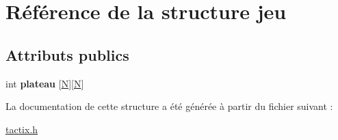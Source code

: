 \hypertarget{structjeu}{\section{Référence de la structure jeu}
\label{structjeu}
}
\subsection*{Attributs publics}
\begin{DoxyCompactItemize}
\item 
\hypertarget{structjeu_acc212ecaaf615948939231d06a649a89}{int {\bfseries plateau} \mbox{[}\hyperlink{tactix_8h_a0240ac851181b84ac374872dc5434ee4}{N}\mbox{]}\mbox{[}\hyperlink{tactix_8h_a0240ac851181b84ac374872dc5434ee4}{N}\mbox{]}}\label{structjeu_acc212ecaaf615948939231d06a649a89}

\end{DoxyCompactItemize}


La documentation de cette structure a été générée à partir du fichier suivant \-:\begin{DoxyCompactItemize}
\item 
\hyperlink{tactix_8h}{tactix.\-h}\end{DoxyCompactItemize}
